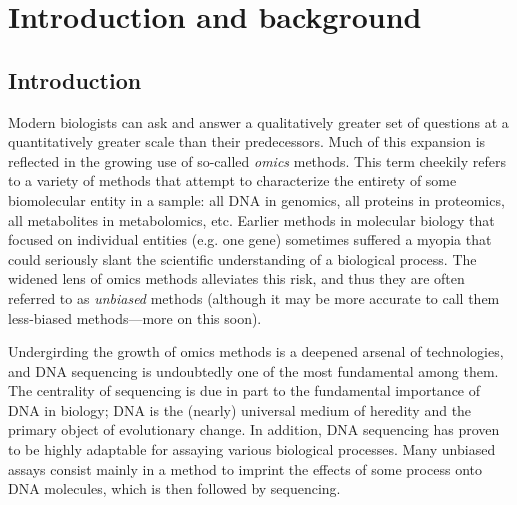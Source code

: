 \documentclass[11pt]{ucthesis}
\begin{document}
%

\part{Introduction and background}

\chapter{Introduction}


Modern biologists can ask and answer a qualitatively greater set of questions at a quantitatively greater scale than their predecessors. Much of this expansion is reflected in the growing use of so-called \emph{omics} methods. This term cheekily refers to a variety of methods that attempt to characterize the entirety of some biomolecular entity in a sample: all DNA in genomics, all proteins in proteomics, all metabolites in metabolomics, etc. Earlier methods in molecular biology that focused on individual entities (e.g. one gene) sometimes suffered a myopia that could seriously slant the scientific understanding of a biological process. The widened lens of omics methods alleviates this risk, and thus they are often referred to as \emph{unbiased} methods (although it may be more accurate to call them less-biased methods---more on this soon).

Undergirding the growth of omics methods is a deepened arsenal of technologies, and DNA sequencing is undoubtedly one of the most fundamental among them. The centrality of sequencing is due in part to the fundamental importance of DNA in biology; DNA is the (nearly) universal medium of heredity and the primary object of evolutionary change. In addition, DNA sequencing has proven to be highly adaptable for assaying various biological processes. Many unbiased assays consist mainly in a method to imprint the effects of some process onto DNA molecules, which is then followed by sequencing. 
\end{document}
